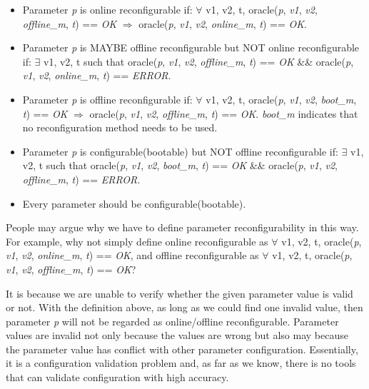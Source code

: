 \begin{itemize}[leftmargin=*]
\vspace{-.1in}
\item 
Parameter \textit{p} is online reconfigurable if: $\forall$ v1, v2, t, oracle(\textit{p}, \textit{v1}, \textit{v2}, \textit{offline\_m}, \textit{t}) == \textit{OK} $\Longrightarrow$ oracle(\textit{p}, \textit{v1}, \textit{v2}, \textit{online\_m}, \textit{t}) == \textit{OK}.

\vspace{-.1in}
\item 
Parameter \textit{p} is MAYBE offline reconfigurable but NOT online reconfigurable if: $\exists$ v1, v2, t such that oracle(\textit{p}, \textit{v1}, \textit{v2}, \textit{offline\_m}, \textit{t}) == \textit{OK} \&\& oracle(\textit{p}, \textit{v1}, \textit{v2}, \textit{online\_m}, \textit{t}) == \textit{ERROR}.

\vspace{-.1in}
\item 
Parameter \textit{p} is offline reconfigurable if: $\forall$ v1, v2, t, oracle(\textit{p}, \textit{v1}, \textit{v2}, \textit{boot\_m}, \textit{t}) == \textit{OK} $\Longrightarrow$ oracle(\textit{p}, \textit{v1}, \textit{v2}, \textit{offline\_m}, \textit{t}) == \textit{OK}. \textit{boot\_m} indicates that no reconfiguration method needs to be used. 

\vspace{-.1in}
\item 
Parameter \textit{p} is configurable(bootable) but NOT offline reconfigurable if: $\exists$ v1, v2, t such that oracle(\textit{p}, \textit{v1}, \textit{v2}, \textit{boot\_m}, \textit{t}) == \textit{OK} \&\& oracle(\textit{p}, \textit{v1}, \textit{v2}, \textit{offline\_m}, \textit{t}) == \textit{ERROR}.

\vspace{-.1in}
\item 
Every parameter should be configurable(bootable).
\end{itemize}

People may argue why we have to define parameter reconfigurability in this way. For example, why not simply define online reconfigurable as $\forall$ v1, v2, t, oracle(\textit{p}, \textit{v1}, \textit{v2}, \textit{online\_m}, \textit{t}) == \textit{OK}, and offline reconfigurable as $\forall$ v1, v2, t, oracle(\textit{p}, \textit{v1}, \textit{v2}, \textit{offline\_m}, \textit{t}) == \textit{OK}?

It is because we are unable to verify whether the given parameter value is valid or not. With the definition above, as long as we could find one invalid value, then parameter \textit{p} will not be regarded as online/offline reconfigurable. Parameter values are invalid not only because the values are wrong but also may because the parameter value has conflict with other parameter configuration. Essentially, it is a configuration validation problem and, as far as we know, there is no tools that can validate configuration with high accuracy. 

